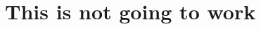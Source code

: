 \documentclass{minimal}
\begin{document}
\hypertarget{this-is-not-going-to-work}{%
\section{This is not going to work}\label{this-is-not-going-to-work}}
\end{document}
